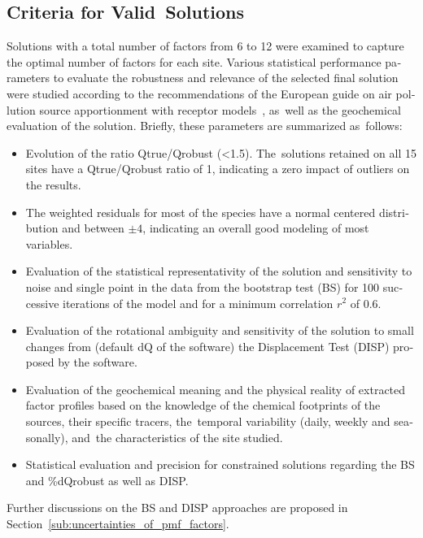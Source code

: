 \begin{otherlanguage}{english}
\subsection{Criteria for Valid~Solutions}%
\label{sub:criteria_for_valid_solutions}

Solutions with a total number of factors from 6 to 12 were examined   to capture the
optimal number of factors for each site. Various statistical performance parameters to
evaluate the robustness and relevance of the selected final solution were studied
according to the recommendations of the European guide on air pollution source
apportionment with receptor models~\cite{belisEuropean2014}, as~well as the geochemical
evaluation of the solution. Briefly, these parameters are summarized as~follows:

\begin{itemize}
    \item Evolution of the ratio Qtrue/Qrobust (<1.5). The~solutions retained
        on all 15 sites have a Qtrue/Qrobust ratio of 1, indicating a zero
        impact of outliers on the results.
    \item The weighted residuals for most of the species have a normal centered
        distribution and between $\pm4$, indicating an overall good modeling of
        most variables.
    \item Evaluation of the statistical representativity of the solution and
        sensitivity to noise and single point in the data from the bootstrap
        test (BS) for 100 successive iterations of the model and for a minimum
        correlation $r^2$ of 0.6.
    \item Evaluation of the rotational ambiguity and sensitivity of the
        solution to small changes from (default dQ of the software) the
        Displacement Test (DISP) proposed by the software.
    \item Evaluation of the geochemical meaning and the physical reality of
        extracted factor profiles based on the knowledge of the chemical
        footprints of the sources, their specific tracers, the~temporal
        variability (daily, weekly and seasonally), and~the characteristics of the
        site studied.
    \item Statistical evaluation and precision for constrained solutions
        regarding the BS and \%dQrobust as well as DISP.
\end{itemize}

Further discussions on the BS and DISP approaches are proposed in
Section~\ref{sub:uncertainties_of_pmf_factors}. 


\end{otherlanguage}

